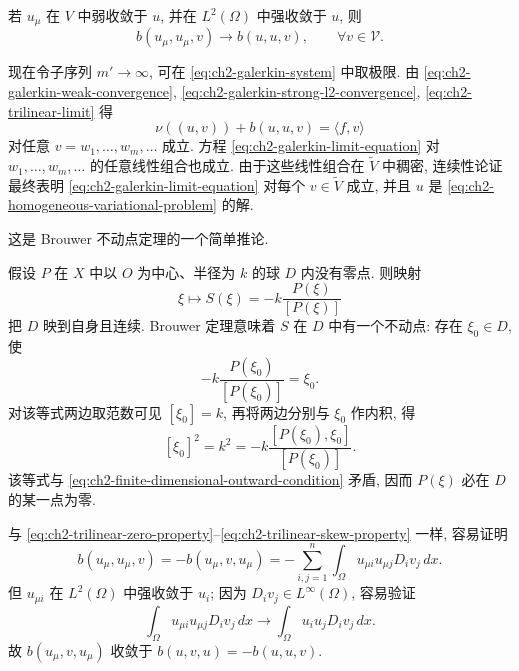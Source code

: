 \begin{Proof}
\begin{Lemma}
\label{lem:ch2-trilinear-limit}
若 $u_\mu$ 在 $V$ 中弱收敛于 $u$, 并在 $L^2(\Omega)$ 中强收敛于 $u$, 则
\begin{equation}
b(u_\mu,u_\mu,v)\longrightarrow b(u,u,v),
\qquad\forall v\in\mathcal V.
\label{eq:ch2-trilinear-limit}
\end{equation}
\end{Lemma}

现在令子序列 $m'\to\infty$, 可在 \eqref{eq:ch2-galerkin-system} 中取极限. 由 \eqref{eq:ch2-galerkin-weak-convergence}, \eqref{eq:ch2-galerkin-strong-l2-convergence}, \eqref{eq:ch2-trilinear-limit} 得
\begin{equation}
\nu((u,v))+b(u,u,v)=\langle f,v\rangle
\label{eq:ch2-galerkin-limit-equation}
\end{equation}
对任意 $v=w_1,\ldots,w_m,\ldots$ 成立. 方程 \eqref{eq:ch2-galerkin-limit-equation} 对 $w_1,\ldots,w_m,\ldots$ 的任意线性组合也成立. 由于这些线性组合在 $\widetilde V$ 中稠密, 连续性论证最终表明 \eqref{eq:ch2-galerkin-limit-equation} 对每个 $v\in\widetilde V$ 成立, 并且 $u$ 是 \eqref{eq:ch2-homogeneous-variational-problem} 的解.
\end{Proof}

\begin{Proof}
这是 Brouwer 不动点定理的一个简单推论.

假设 $P$ 在 $X$ 中以 $O$ 为中心、半径为 $k$ 的球 $D$ 内没有零点. 则映射
\[
\xi\longmapsto S(\xi)=-k\frac{P(\xi)}{[P(\xi)]}
\]
把 $D$ 映到自身且连续. Brouwer 定理意味着 $S$ 在 $D$ 中有一个不动点: 存在 $\xi_0\in D$, 使
\[
-k\frac{P(\xi_0)}{[P(\xi_0)]}=\xi_0.
\]
对该等式两边取范数可见 $[\xi_0]=k$, 再将两边分别与 $\xi_0$ 作内积, 得
\[
[\xi_0]^2=k^2=-k\frac{[P(\xi_0),\xi_0]}{[P(\xi_0)]}.
\]
该等式与 \eqref{eq:ch2-finite-dimensional-outward-condition} 矛盾, 因而 $P(\xi)$ 必在 $D$ 的某一点为零.
\end{Proof}

\begin{Proof}
与 \eqref{eq:ch2-trilinear-zero-property}--\eqref{eq:ch2-trilinear-skew-property} 一样, 容易证明
\[
b(u_\mu,u_\mu,v)=-b(u_\mu,v,u_\mu)
=-\sum_{i,j=1}^{n}\int_\Omega u_{\mu i}u_{\mu j}D_i v_j\,dx.
\]
但 $u_{\mu i}$ 在 $L^2(\Omega)$ 中强收敛于 $u_i$; 因为 $D_iv_j\in L^\infty(\Omega)$, 容易验证
\[
\int_\Omega u_{\mu i}u_{\mu j}D_iv_j\,dx
\longrightarrow
\int_\Omega u_i u_jD_iv_j\,dx.
\]
故 $b(u_\mu,v,u_\mu)$ 收敛于 $b(u,v,u)=-b(u,u,v)$.
\end{Proof}

